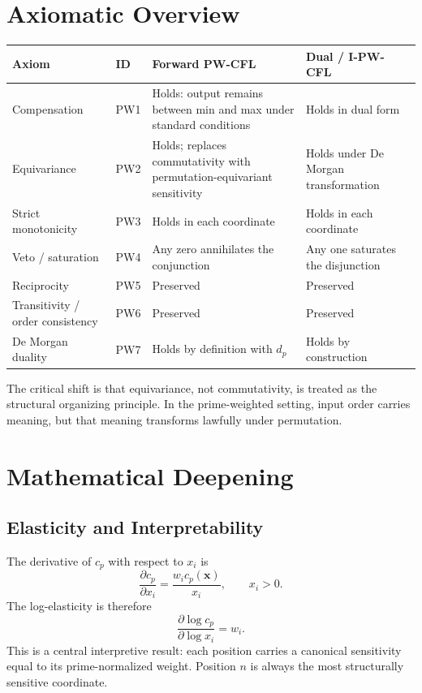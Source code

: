 \documentclass[11pt]{article}
\begin{document}
\section{Axiomatic Overview}
\begin{longtable}{>{\raggedright\arraybackslash}p{2.2cm} >{\raggedright\arraybackslash}p{2.2cm} >{\raggedright\arraybackslash}p{4.1cm} >{\raggedright\arraybackslash}p{4.1cm}}
\toprule
Axiom & ID & Forward PW-CFL & Dual / I-PW-CFL \\
\midrule
Compensation & PW1 & Holds: output remains between min and max under standard conditions & Holds in dual form \\
Equivariance & PW2 & Holds; replaces commutativity with permutation-equivariant sensitivity & Holds under De Morgan transformation \\
Strict monotonicity & PW3 & Holds in each coordinate & Holds in each coordinate \\
Veto / saturation & PW4 & Any zero annihilates the conjunction & Any one saturates the disjunction \\
Reciprocity & PW5 & Preserved & Preserved \\
Transitivity / order consistency & PW6 & Preserved & Preserved \\
De Morgan duality & PW7 & Holds by definition with $d_p$ & Holds by construction \\
\bottomrule
\end{longtable}

The critical shift is that equivariance, not commutativity, is treated as the structural organizing principle. In the prime-weighted setting, input order carries meaning, but that meaning transforms lawfully under permutation.

\section{Mathematical Deepening}
\subsection{Elasticity and Interpretability}
The derivative of $c_p$ with respect to $x_i$ is
\[
\frac{\partial c_p}{\partial x_i} = \frac{w_i c_p(\mathbf{x})}{x_i}, \qquad x_i>0.
\]
The log-elasticity is therefore
\[
\frac{\partial \log c_p}{\partial \log x_i} = w_i.
\]
This is a central interpretive result: each position carries a canonical sensitivity equal to its prime-normalized weight. Position $n$ is always the most structurally sensitive coordinate.
\end{document}
